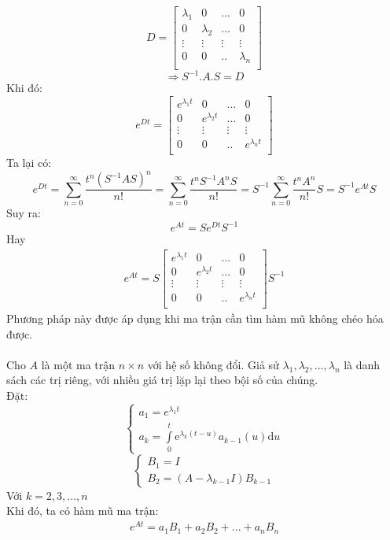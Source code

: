 $$D=
\begin{bmatrix}
    \lambda_1 & 0 &... &0\\
    0 & \lambda_2 &... &0\\
    \vdots & \vdots&\vdots& \vdots\\
    0 & 0 &.. &\lambda_n\\
\end{bmatrix}$$
$$\Rightarrow S^{-1}.A.S=D$$
Khi đó:
$$e^{Dt}=
\begin{bmatrix}
    e^{\lambda_1t} & 0 &... &0\\
    0 & e^{\lambda_2t} &... &0\\
    \vdots & \vdots&\vdots& \vdots\\
    0 & 0 &.. &e^{\lambda_nt}\\
\end{bmatrix}$$
Ta lại có:
$$e^{Dt}=\sum_{n=0}^{\infty}\frac{t^{n}(S^{-1}AS)^{n}}{n!}=\sum_{n=0}^{\infty}\frac{t^{n}S^{-1}A^{n}S}{n!}=S^{-1}\sum_{n=0}^{\infty}\frac{t^{n}A^{n}}{n!}S=S^{-1}e^{At}S$$
Suy ra:
$$e^{At}=Se^{Dt}S^{-1}$$
Hay
\begin{align}
    e^{At}=S
\begin{bmatrix}
    e^{\lambda_1t} & 0 &... &0\\
    0 & e^{\lambda_2t} &... &0\\
    \vdots & \vdots&\vdots& \vdots\\
    0 & 0 &.. &e^{\lambda_nt}\\
\end{bmatrix}
S^{-1}
\end{align}
Phương pháp này được áp dụng khi ma trận cần tìm hàm mũ không chéo hóa được.\\\\
Cho $A$ là một ma trận $n \times n$ với hệ số không đổi. Giả sử ${\lambda_1,\lambda_2,...,\lambda_n}$ là danh sách các trị riêng, với nhiều giá trị lặp lại theo bội số của chúng.\\
Đặt:
$$\begin{cases}
        a_1=e^{\lambda_1t}\\
        a_k=\displaystyle\int\limits_{0}^{t} \mathrm{e}^{\lambda_k(t-u)}a_{k-1}(u)\mathrm{d}u
\end{cases}$$
$$\begin{cases}
        B_1=I\\
        B_2=(A-\lambda_{k-1}I)B_{k-1}
\end{cases}$$
Với $k=2, 3,..., n$\\
Khi đó, ta có hàm mũ ma trận:
\begin{align}
   e^{At}=a_1B_1+a_2B_2+...+a_nB_n
\end{align}
